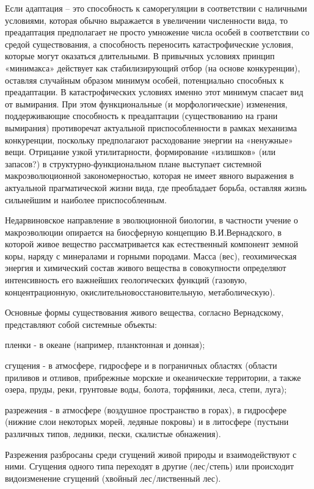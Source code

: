 \documentclass[exam_answers.tex]{subfiles}
\begin{document}
Если адаптация – это способность к саморегуляции в соответствии с
наличными условиями, которая обычно выражается в увеличении численности
вида, то преадаптация предполагает не просто умножение числа особей в
соответствии со средой существования, а способность переносить
катастрофические условия, которые могут оказаться длительными. В
привычных условиях принцип «минимакса» действует как стабилизирующий
отбор (на основе конкуренции), оставляя случайным образом минимум особей,
потенциально способных к преадаптации. В катастрофических условиях
именно этот минимум спасает вид от вымирания. При этом функциональные (и
морфологические) изменения, поддерживающие способность к преадаптации
(существованию на грани вымирания) противоречат актуальной
приспособленности в рамках механизма конкуренции, поскольку предполагают
расходование энергии на «ненужные» вещи. Отрицание узкой утилитарности,
формирование «излишков» (или запасов?) в структурно-функциональном плане
выступает системной макроэволюционной закономерностью, которая не имеет
явного выражения в актуальной прагматической жизни вида, где преобладает
борьба, оставляя жизнь сильнейшим и наиболее приспособленным.

Недарвиновское направление в эволюционной биологии, в частности
учение о макроэволюции опирается на биосферную концепцию
В.И.Вернадского, в которой живое вещество рассматривается как
естественный компонент земной коры, наряду с минералами и горными
породами. Масса (вес), геохимическая энергия и химический состав живого
вещества в совокупности определяют интенсивность его важнейших
геологических функций (газовую, концентрационную, окислительновосстановительную, метаболическую).

Основные формы существования живого вещества, согласно Вернадскому,
представляют собой системные объекты:

пленки - в океане (например, планктонная и донная);

сгущения - в атмосфере, гидросфере и в пограничных областях (области
приливов и отливов, прибрежные морские и океанические территории, а также
озера, пруды, реки, грунтовые воды, болота, торфяники, леса, степи, луга);

разрежения - в атмосфере (воздушное пространство в горах), в гидросфере
(нижние слои некоторых морей, ледяные покровы) и в литосфере (пустыни
различных типов, ледники, пески, скалистые обнажения).

Разрежения разбросаны среди сгущений живой природы и
взаимодействуют с ними. Сгущения одного типа переходят в другие (лес/степь)
или происходит видоизменение сгущений (хвойный лес/лиственный лес).
\end{document}
